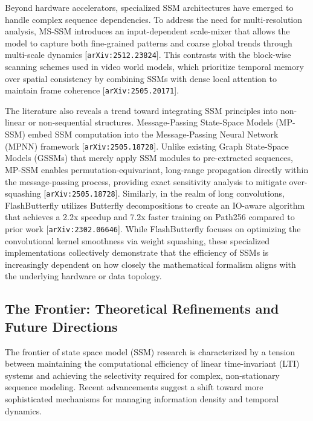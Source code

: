 \documentclass[11pt]{article}
\begin{document}
Beyond hardware accelerators, specialized SSM architectures have emerged to handle complex sequence dependencies. To address the need for multi-resolution analysis, MS-SSM introduces an input-dependent scale-mixer that allows the model to capture both fine-grained patterns and coarse global trends through multi-scale dynamics [\texttt{arXiv:2512.23824}]. This contrasts with the block-wise scanning schemes used in video world models, which prioritize temporal memory over spatial consistency by combining SSMs with dense local attention to maintain frame coherence [\texttt{arXiv:2505.20171}].

The literature also reveals a trend toward integrating SSM principles into non-linear or non-sequential structures. Message-Passing State-Space Models (MP-SSM) embed SSM computation into the Message-Passing Neural Network (MPNN) framework [\texttt{arXiv:2505.18728}]. Unlike existing Graph State-Space Models (GSSMs) that merely apply SSM modules to pre-extracted sequences, MP-SSM enables permutation-equivariant, long-range propagation directly within the message-passing process, providing exact sensitivity analysis to mitigate over-squashing [\texttt{arXiv:2505.18728}]. Similarly, in the realm of long convolutions, FlashButterfly utilizes Butterfly decompositions to create an IO-aware algorithm that achieves a 2.2x speedup and 7.2x faster training on Path256 compared to prior work [\texttt{arXiv:2302.06646}]. While FlashButterfly focuses on optimizing the convolutional kernel smoothness via weight squashing, these specialized implementations collectively demonstrate that the efficiency of SSMs is increasingly dependent on how closely the mathematical formalism aligns with the underlying hardware or data topology.

\subsection{The Frontier: Theoretical Refinements and Future Directions}

The frontier of state space model (SSM) research is characterized by a tension between maintaining the computational efficiency of linear time-invariant (LTI) systems and achieving the selectivity required for complex, non-stationary sequence modeling. Recent advancements suggest a shift toward more sophisticated mechanisms for managing information density and temporal dynamics.
\end{document}
